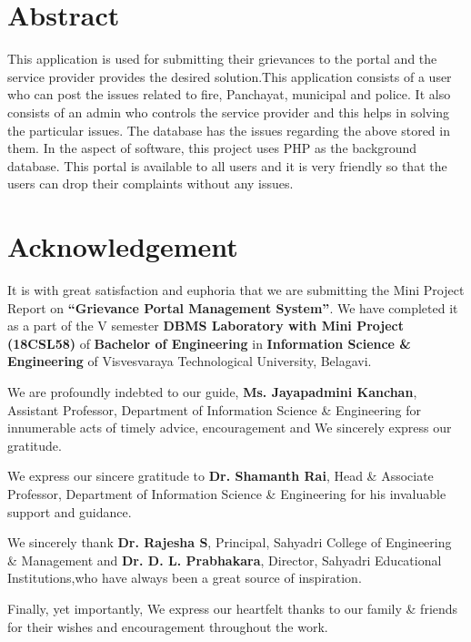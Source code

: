 \documentclass[12pt,a4paper]{report}
\begin{document}
\newpage
\pagestyle{plain}
\chapter*{Abstract}
This application is used for submitting their grievances to the portal and the service provider provides the desired solution.This application  consists of a user who can post the issues related to fire, Panchayat, municipal and police. It also consists of an admin who controls the service provider and this helps in solving the particular issues. The database has the issues regarding the above stored in them. In the aspect of software, this project uses PHP as the background database. This portal is available to all users and it is very friendly so that the users can drop their complaints without any issues.

\chapter*{Acknowledgement}
It is with great satisfaction and euphoria that we are submitting the Mini Project Report on \textbf{“Grievance Portal Management System”}. We have completed it as a part of the V semester \textbf{DBMS Laboratory with Mini Project (18CSL58)} of \textbf{Bachelor of Engineering} in \textbf{Information Science \& Engineering} of Visvesvaraya Technological University, Belagavi.
\par
\vspace{0.15in}
\noindent We are profoundly indebted to our guide, \textbf{Ms. Jayapadmini Kanchan}, Assistant Professor, Department of Information Science \& Engineering for innumerable acts of timely advice, encouragement and We sincerely express our gratitude.
\par
\vspace{0.15in}
\noindent We express our sincere gratitude to \textbf{Dr. Shamanth Rai}, Head \& Associate Professor, Department of Information Science \& Engineering for his invaluable support and guidance.
\par
\vspace{0.15in}
\noindent We sincerely thank  \textbf{Dr. Rajesha S}, Principal, Sahyadri College of Engineering \& Management  and \textbf{Dr. D. L. Prabhakara}, Director, Sahyadri Educational Institutions,who have always been a great source of inspiration.
\par
\vspace{0.15in}
\noindent Finally, yet importantly, We express our heartfelt thanks to our family \& friends for their wishes and encouragement throughout the work.
\\
\\
\end{document}
